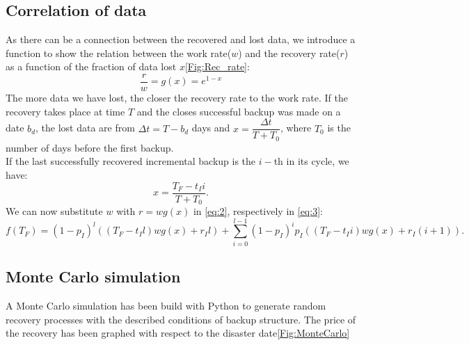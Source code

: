 \documentclass[11pt, a4paper]{article}
\theoremstyle{definition}
\begin{document}
		\subsection{Correlation of data}
			As there can be a connection between the recovered and lost data, we introduce a function to show the relation between the work rate($w$) and the recovery rate($r$) as a function of the fraction of data lost $x$\ref{Fig:Rec_rate}:
			$$
			\dfrac{r}{w} = g(x) = e^{1-x}
			$$
			The more data we have lost, the closer the recovery rate to the work rate. If the recovery takes place at time $T$ and the closes successful backup was made on a date $b_d$, the lost data are from $\Delta t = T - b_d$ days and $x = \dfrac{\Delta t}{T + T_0}$, where $T_0$ is the number of days before the first backup.\\
			If the last successfully recovered incremental backup is the $i-$th in its cycle, we have:
			$$x = \dfrac{T_F-t_Ii}{T + T_0}.$$
			We can now substitute $w$ with $r=wg(x)$ in \ref{eq:2}, respectively in \ref{eq:3}:
			\begin{equation}
			\label{eq:4}
			f(T_F) = (1-p_I)^l((T_F-t_Il)wg(x) + r_Il) + \displaystyle \sum_{i=0}^{l-1} (1-p_I)^{i}p_I((T_F-t_Ii)wg(x) + r_I(i+1)).
			\end{equation}
		\subsection{Monte Carlo simulation}
			A Monte Carlo simulation has been build with Python to generate random recovery processes with the described conditions of backup structure. The price of the recovery has been graphed with respect to the disaster date\ref{Fig:MonteCarlo}
		
\end{document}
